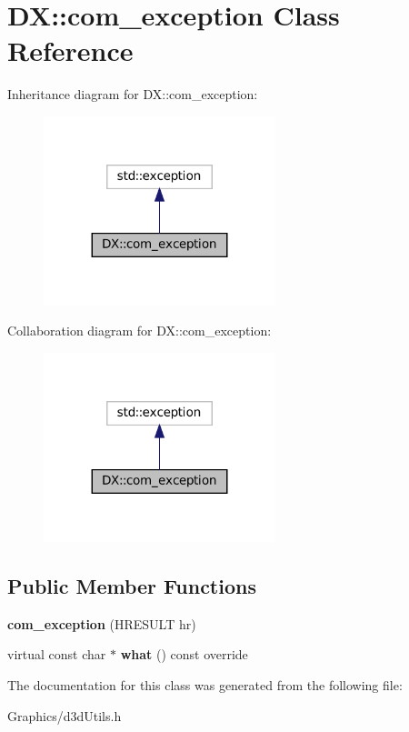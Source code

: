 \hypertarget{classDX_1_1com__exception}{}\section{DX\+:\+:com\+\_\+exception Class Reference}
\label{classDX_1_1com__exception}


Inheritance diagram for DX\+:\+:com\+\_\+exception\+:\nopagebreak
\begin{figure}[H]
\begin{center}
\leavevmode
\includegraphics[width=191pt]{classDX_1_1com__exception__inherit__graph}
\end{center}
\end{figure}


Collaboration diagram for DX\+:\+:com\+\_\+exception\+:\nopagebreak
\begin{figure}[H]
\begin{center}
\leavevmode
\includegraphics[width=191pt]{classDX_1_1com__exception__coll__graph}
\end{center}
\end{figure}
\subsection*{Public Member Functions}
\begin{DoxyCompactItemize}
\item 
\mbox{\label{classDX_1_1com__exception_aa1867f0d21fb5d5cdac40d79cfa07ffb}} 
{\bfseries com\+\_\+exception} (H\+R\+E\+S\+U\+LT hr)
\item 
\mbox{\label{classDX_1_1com__exception_aec8c85514b6908b1ddc794d7ed18e9e5}} 
virtual const char $\ast$ {\bfseries what} () const override
\end{DoxyCompactItemize}


The documentation for this class was generated from the following file\+:\begin{DoxyCompactItemize}
\item 
Graphics/d3d\+Utils.\+h\end{DoxyCompactItemize}
